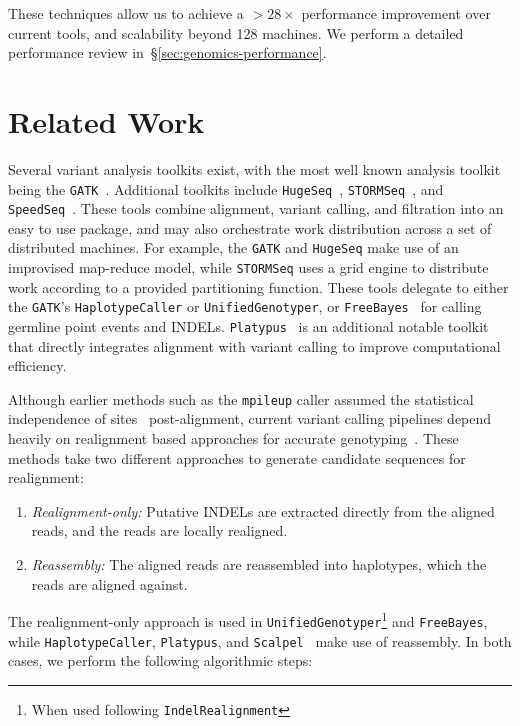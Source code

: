 \documentclass[masters]{ucbthesis}
\begin{document}
These techniques allow us to achieve a $>28\times$ performance improvement over current tools, and
scalability beyond 128 machines. We perform a detailed performance review
in~\S\ref{sec:genomics-performance}.

\section{Related Work}
\label{sec:related-work}

Several variant analysis toolkits exist, with the most well known analysis toolkit being the
\texttt{GATK}~\cite{depristo11}. Additional toolkits include \texttt{HugeSeq}~\cite{lam12},
\texttt{STORMSeq}~\cite{karczewski14}, and \texttt{SpeedSeq}~\cite{chiang14}. These tools combine
alignment, variant calling, and filtration into an easy to use package, and may also orchestrate
work distribution across a set of distributed machines. For example, the \texttt{GATK} and
\texttt{HugeSeq} make use of an improvised map-reduce model, while \texttt{STORMSeq} uses a grid
engine to distribute work according to a provided partitioning function. These tools delegate to either
the \texttt{GATK}'s \texttt{HaplotypeCaller} or \texttt{UnifiedGenotyper}, or
\texttt{FreeBayes}~\cite{garrison12} for calling germline point events and INDELs.
\texttt{Platypus}~\cite{rimmer14} is an additional notable toolkit that directly integrates alignment with
variant calling to improve computational efficiency.

Although earlier methods such as the \texttt{mpileup} caller assumed the statistical independence of
sites~\cite{li11snp} post-alignment, current variant calling pipelines depend heavily on realignment based
approaches for accurate genotyping~\cite{li14}. These methods take two different approaches to generate candidate sequences for realignment:

\begin{enumerate}
\item \emph{Realignment-only:} Putative INDELs are extracted directly from the aligned reads, and the
reads are locally realigned.
\item \emph{Reassembly:} The aligned reads are reassembled into haplotypes, which the reads are
aligned against.
\end{enumerate}

The realignment-only approach is used in \texttt{UnifiedGenotyper}\footnote{When used following
\texttt{IndelRealignment}} and \texttt{FreeBayes}, while \texttt{HaplotypeCaller}, \texttt{Platypus}, and
\texttt{Scalpel}~\cite{narzisi14} make use of reassembly. In both cases, we perform the following
algorithmic steps:
\end{document}
